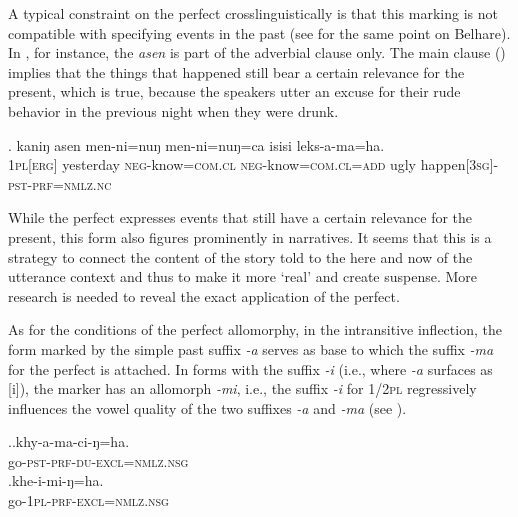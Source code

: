 A typical constraint on the perfect crosslinguistically is that this  marking is not compatible with specifying events in the past (see \citet[176]{Bickel1996Aspect} for the same point on Belhare). In \Next, for instance, the  \emph{asen} is part of the adverbial clause only. The main clause () implies that the things that happened still bear a certain relevance for the present, which is true, because the speakers utter an excuse for their rude behavior in the previous night when they were drunk.

\exg.	kaniŋ asen      men-ni=nuŋ         men-ni=nuŋ=ca                isisi leks-a-ma=ha.\\
{\scshape  1pl[erg]} yesterday {\scshape neg-}know{\scshape =com.cl} {\scshape neg-}know{\scshape =com.cl=add} ugly happen{\scshape [3sg]-pst-prf=nmlz.nc}\\
 
	
While the perfect expresses events that still have a certain relevance for the present, this  form also figures prominently in narratives. It seems that this is a strategy to connect the content of the story told to the here and now of the utterance context and thus to make it more ‘real’ and create suspense. More research is needed to reveal the exact application of the perfect.

As for the conditions of the perfect allomorphy, in the intransitive inflection, the form marked by the simple past suffix \emph{-a} serves as base to which the suffix \emph{-ma} for the perfect is attached. In forms with the suffix \emph{-i}  (i.e., where \emph{-a} surfaces as [i]), the marker has an allomorph \emph{-mi}, i.e., the suffix \emph{-i} for  {\scshape 1/2pl} regressively influences the vowel quality of the two suffixes \emph{-a} and \emph{-ma} (see \Next). 

\ex.\ag.khy-a-ma-ci-ŋ=ha.\\
go{\scshape -pst-prf-du-excl=nmlz.nsg}\\
\bg.khe-i-mi-ŋ=ha.\\
go{\scshape -1pl-prf-excl=nmlz.nsg}\\


